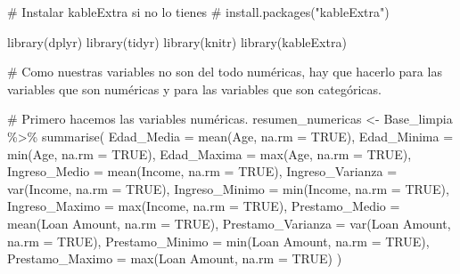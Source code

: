 \documentclass[
  letterpaper,
  DIV=11,
  numbers=noendperiod]{scrreprt}
\newenvironment{Shaded}{\begin{snugshade}}{\end{snugshade}}
\newcommand{\AttributeTok}[1]{\textcolor[rgb]{0.40,0.45,0.13}{#1}}
\newcommand{\CommentTok}[1]{\textcolor[rgb]{0.37,0.37,0.37}{#1}}
\newcommand{\ConstantTok}[1]{\textcolor[rgb]{0.56,0.35,0.01}{#1}}
\newcommand{\FunctionTok}[1]{\textcolor[rgb]{0.28,0.35,0.67}{#1}}
\newcommand{\NormalTok}[1]{\textcolor[rgb]{0.00,0.23,0.31}{#1}}
\newcommand{\OtherTok}[1]{\textcolor[rgb]{0.00,0.23,0.31}{#1}}
\newcommand{\SpecialCharTok}[1]{\textcolor[rgb]{0.37,0.37,0.37}{#1}}
\newcommand{\StringTok}[1]{\textcolor[rgb]{0.13,0.47,0.30}{#1}}
\begin{document}
\begin{Shaded}
\begin{Highlighting}[]
\CommentTok{\# Instalar kableExtra si no lo tienes}
\CommentTok{\# install.packages("kableExtra") }

\FunctionTok{library}\NormalTok{(dplyr)}
\FunctionTok{library}\NormalTok{(tidyr)}
\FunctionTok{library}\NormalTok{(knitr)}
\FunctionTok{library}\NormalTok{(kableExtra)}

\CommentTok{\# Como nuestras variables no son del todo numéricas, hay que hacerlo para las variables que son numéricas y para las variables que son categóricas. }

\CommentTok{\# Primero hacemos las variables numéricas.}
\NormalTok{resumen\_numericas }\OtherTok{\textless{}{-}}\NormalTok{ Base\_limpia }\SpecialCharTok{\%\textgreater{}\%}
  \FunctionTok{summarise}\NormalTok{(}
    \AttributeTok{Edad\_Media =} \FunctionTok{mean}\NormalTok{(Age, }\AttributeTok{na.rm =} \ConstantTok{TRUE}\NormalTok{),}
    \AttributeTok{Edad\_Minima =} \FunctionTok{min}\NormalTok{(Age, }\AttributeTok{na.rm =} \ConstantTok{TRUE}\NormalTok{),}
    \AttributeTok{Edad\_Maxima =} \FunctionTok{max}\NormalTok{(Age, }\AttributeTok{na.rm =} \ConstantTok{TRUE}\NormalTok{),}
    \AttributeTok{Ingreso\_Medio =} \FunctionTok{mean}\NormalTok{(Income, }\AttributeTok{na.rm =} \ConstantTok{TRUE}\NormalTok{),}
    \AttributeTok{Ingreso\_Varianza =} \FunctionTok{var}\NormalTok{(Income, }\AttributeTok{na.rm =} \ConstantTok{TRUE}\NormalTok{),}
    \AttributeTok{Ingreso\_Minimo =} \FunctionTok{min}\NormalTok{(Income, }\AttributeTok{na.rm =} \ConstantTok{TRUE}\NormalTok{),}
    \AttributeTok{Ingreso\_Maximo =} \FunctionTok{max}\NormalTok{(Income, }\AttributeTok{na.rm =} \ConstantTok{TRUE}\NormalTok{),}
    \AttributeTok{Prestamo\_Medio =} \FunctionTok{mean}\NormalTok{(}\StringTok{\textasciigrave{}}\AttributeTok{Loan Amount}\StringTok{\textasciigrave{}}\NormalTok{, }\AttributeTok{na.rm =} \ConstantTok{TRUE}\NormalTok{),}
    \AttributeTok{Prestamo\_Varianza =} \FunctionTok{var}\NormalTok{(}\StringTok{\textasciigrave{}}\AttributeTok{Loan Amount}\StringTok{\textasciigrave{}}\NormalTok{, }\AttributeTok{na.rm =} \ConstantTok{TRUE}\NormalTok{),}
    \AttributeTok{Prestamo\_Minimo =} \FunctionTok{min}\NormalTok{(}\StringTok{\textasciigrave{}}\AttributeTok{Loan Amount}\StringTok{\textasciigrave{}}\NormalTok{, }\AttributeTok{na.rm =} \ConstantTok{TRUE}\NormalTok{),}
    \AttributeTok{Prestamo\_Maximo =} \FunctionTok{max}\NormalTok{(}\StringTok{\textasciigrave{}}\AttributeTok{Loan Amount}\StringTok{\textasciigrave{}}\NormalTok{, }\AttributeTok{na.rm =} \ConstantTok{TRUE}\NormalTok{)}
\NormalTok{  )}


\end{Highlighting}
\end{Shaded}
\end{document}
